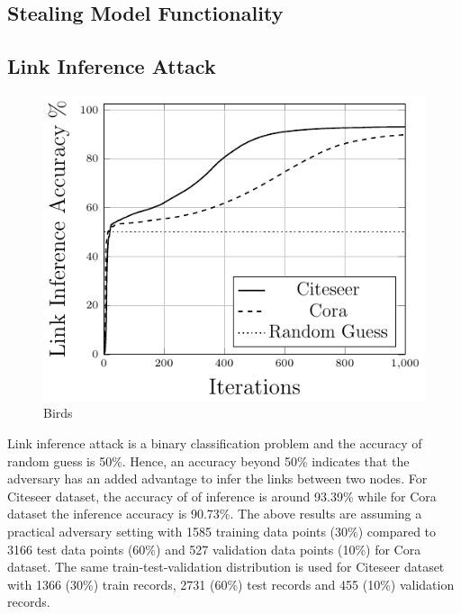 \subsection{Stealing Model Functionality}


\subsection{Link Inference Attack}

\begin{figure}
  \begin{center}
    \includegraphics[width=\linewidth]{figures/LinkInfer/LinkInfer.pdf}
  \end{center}
  \caption{Birds}
\end{figure}


Link inference attack is a binary classification problem and the accuracy of random guess is 50\%.
Hence, an accuracy beyond 50\% indicates that the adversary has an added advantage to infer the links between two nodes.
For Citeseer dataset, the accuracy of of inference is around 93.39\% while for Cora dataset the inference accuracy is 90.73\%.
The above results are assuming a practical adversary setting with 1585 training data points (30\%) compared to 3166 test data points (60\%) and 527 validation data points (10\%) for Cora dataset.
The same train-test-validation distribution is used for Citeseer dataset with 1366 (30\%) train records, 2731 (60\%) test records and 455 (10\%) validation records.



